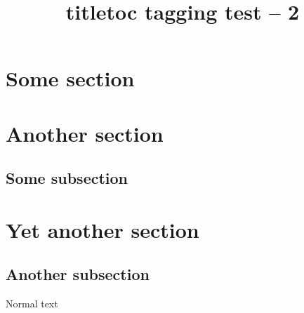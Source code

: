 \documentclass{article}
\title{titletoc tagging test -- 2}
\begin{document}
\tableofcontents
\section{Some section}
\section{Another section}
\subsection{Some subsection}
\section{Yet another section}
\subsection{Another subsection}
Normal text
\end{document}
